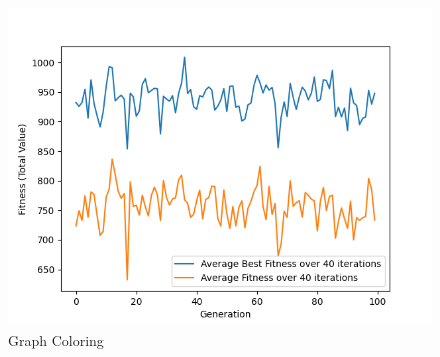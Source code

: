 \documentclass[11pt, letterpaper]{article}
\begin{document}
\begin{figure}[H]
  \includegraphics[width=\linewidth]{images/knapsack_rd_fp.png}
  \caption{Graph Coloring}
\endminipage
\end{figure}
\end{document}
